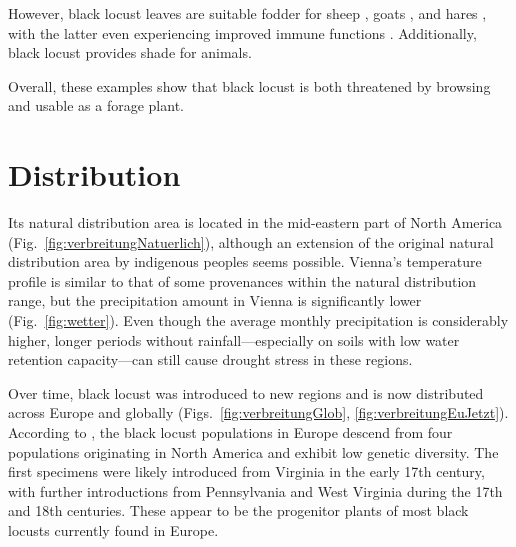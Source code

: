 However, black locust leaves are suitable fodder for sheep \citep{ganai2009robnieSchaf}, goats \citep{papachristou1999robinieZiege}, and hares \citep{singh2010robnieHasennahrung}, with the latter even experiencing improved immune functions \citep{yang2017robinieHasen}. Additionally, black locust provides shade for animals.

Overall, these examples show that black locust is both threatened by browsing and usable as a forage plant.


\section{Distribution}


Its natural distribution area is located in the mid-eastern part of North America (Fig.~\ref{fig:verbreitungNatuerlich}), although an extension of the original natural distribution area by indigenous peoples seems possible. Vienna's temperature profile is similar to that of some provenances within the natural distribution range, but the precipitation amount in Vienna is significantly lower (Fig.~\ref{fig:wetter}). Even though the average monthly precipitation is considerably higher, longer periods without rainfall—especially on soils with low water retention capacity—can still cause drought stress in these regions.


Over time, black locust was introduced to new regions and is now distributed across Europe and globally (Figs.~\ref{fig:verbreitungGlob}, \ref{fig:verbreitungEuJetzt}). According to \citet{bouteiller2019robinie}, the black locust populations in Europe descend from four populations originating in North America and exhibit low genetic diversity. The first specimens were likely introduced from Virginia in the early 17th century, with further introductions from Pennsylvania and West Virginia during the 17th and 18th centuries. These appear to be the progenitor plants of most black locusts currently found in Europe.

